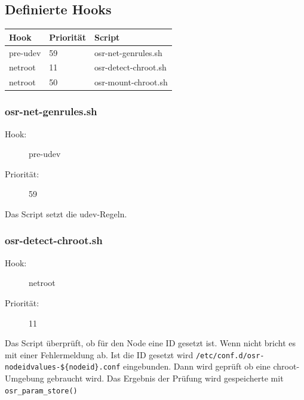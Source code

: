 \documentclass[10pt,a4paper]{article}
\begin{document}
\subsection{Definierte Hooks}

\begin{tabular}{|l|l|l|}
 \hline
\textbf{Hook} & \textbf{Priorität} & \textbf{Script} \\ \hline
pre-udev   & 59 & osr-net-genrules.sh \\ \hline
netroot    & 11 & osr-detect-chroot.sh \\ \hline
netroot    & 50 & osr-mount-chroot.sh \\ \hline
\end{tabular} 


\subsubsection{osr-net-genrules.sh}

\begin{description}
\item[Hook:] pre-udev
\item[Priorität:] 59
\end{description}

Das Script setzt die udev-Regeln.

\subsubsection{osr-detect-chroot.sh}
\label{osrdetectchroot} 

\begin{description}
\item[Hook:] netroot
\item[Priorität:] 11
\end{description}

Das Script überprüft, ob für den Node eine ID gesetzt ist. Wenn nicht bricht es mit einer Fehlermeldung ab. Ist die ID gesetzt wird \verb|/etc/conf.d/osr-nodeidvalues-${nodeid}.conf| eingebunden. Dann wird geprüft ob eine chroot-Umgebung gebraucht wird. Das Ergebnis der Prüfung wird gespeicherte mit \texttt{osr\_param\_store()}
\end{document}
